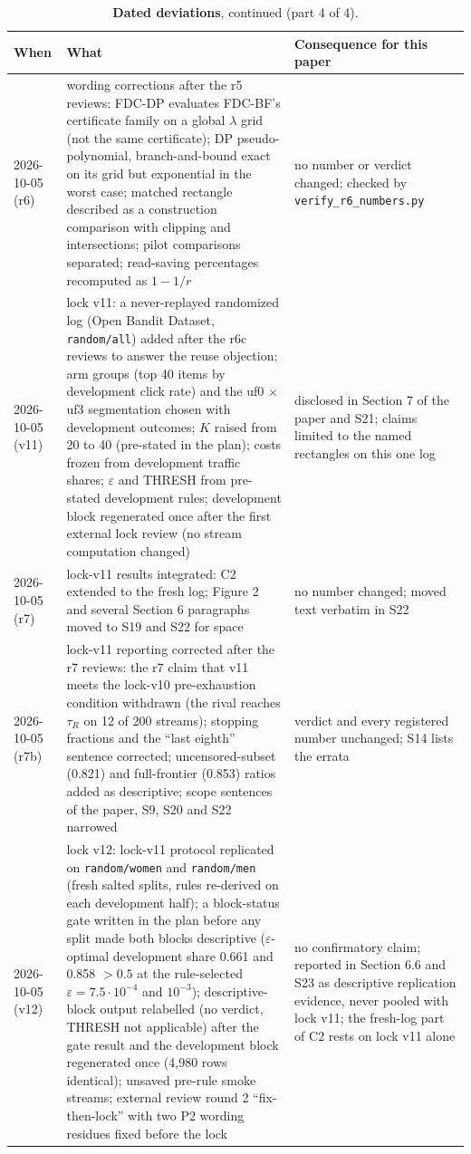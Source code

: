 \documentclass[sigconf,anonymous,review]{acmart}
\newcommand{\eps}{\varepsilon}
\begin{document}
\begin{table}[p]
\addtocounter{table}{-1}
\caption{\textbf{Dated deviations}, continued (part 4 of 4).}
\small
\begin{tabular}{@{}l>{\raggedright\arraybackslash}p{6.6cm}>{\raggedright\arraybackslash}p{7.6cm}@{}}
\toprule
When & What & Consequence for this paper \\
\midrule
2026-10-05 (r6) & wording corrections after the r5 reviews: FDC-DP evaluates FDC-BF's certificate family on a global $\lambda$ grid (not the same certificate); DP pseudo-polynomial, branch-and-bound exact on its grid but exponential in the worst case; matched rectangle described as a construction comparison with clipping and intersections; pilot comparisons separated; read-saving percentages recomputed as $1 - 1/r$ & no number or verdict changed; checked by \texttt{verify\_r6\_numbers.py} \\
2026-10-05 (v11) & lock v11: a never-replayed randomized log (Open Bandit Dataset, \texttt{random/all}) added after the r6c reviews to answer the reuse objection; arm groups (top 40 items by development click rate) and the uf0 $\times$ uf3 segmentation chosen with development outcomes; $K$ raised from 20 to 40 (pre-stated in the plan); costs frozen from development traffic shares; $\eps$ and THRESH from pre-stated development rules; development block regenerated once after the first external lock review (no stream computation changed) & disclosed in Section 7 of the paper and S21; claims limited to the named rectangles on this one log \\
2026-10-05 (r7) & lock-v11 results integrated: C2 extended to the fresh log; Figure 2 and several Section 6 paragraphs moved to S19 and S22 for space & no number changed; moved text verbatim in S22 \\
2026-10-05 (r7b) & lock-v11 reporting corrected after the r7 reviews: the r7 claim that v11 meets the lock-v10 pre-exhaustion condition withdrawn (the rival reaches $\tau_R$ on 12 of 200 streams); stopping fractions and the ``last eighth'' sentence corrected; uncensored-subset (0.821) and full-frontier (0.853) ratios added as descriptive; scope sentences of the paper, S9, S20 and S22 narrowed & verdict and every registered number unchanged; S14 lists the errata \\
2026-10-05 (v12) & lock v12: lock-v11 protocol replicated on \texttt{random/women} and \texttt{random/men} (fresh salted splits, rules re-derived on each development half); a block-status gate written in the plan before any split made both blocks descriptive ($\eps$-optimal development share 0.661 and 0.858 $> 0.5$ at the rule-selected $\eps = 7.5\cdot 10^{-4}$ and $10^{-3}$); descriptive-block output relabelled (no verdict, THRESH not applicable) after the gate result and the development block regenerated once (4,980 rows identical); unsaved pre-rule smoke streams; external review round 2 ``fix-then-lock'' with two P2 wording residues fixed before the lock & no confirmatory claim; reported in Section 6.6 and S23 as descriptive replication evidence, never pooled with lock v11; the fresh-log part of C2 rests on lock v11 alone \\

\end{tabular}
\end{table}
\end{document}
